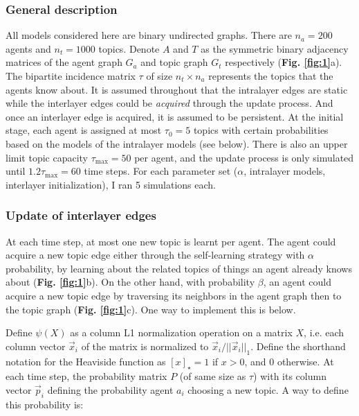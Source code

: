 \documentclass{svproc}
\begin{document}
\subsubsection*{General description}

All models considered here are binary undirected graphs. There are $n_a = 200$ agents and $n_t = 1000$ topics. Denote $A$ and $T$ as the symmetric binary adjacency matrices of the agent graph $G_a$ and topic graph $G_t$ respectively (\textbf{Fig. \ref{fig:1}}a). The bipartite incidence matrix $\tau$ of size $n_t \times n_a$ represents the topics that the agents know about. It is assumed throughout that the intralayer edges are static while the interlayer edges could be \textit{acquired} through the update process. And once an interlayer edge is acquired, it is assumed to be persistent. At the initial stage, each agent is assigned at most $\tau_0 = 5$ topics with certain probabilities based on the models of the intralayer models (see below). There is also an upper limit topic capacity $\tau_{\mathrm{max}} = 50$ per agent, and the update process is only simulated until $1.2 \tau_{\mathrm{max}} = 60$ time steps. For each parameter set ($\alpha$, intralayer models, interlayer initialization), I ran 5 simulations each.

\vspace{-1em}
\subsubsection*{Update of interlayer edges}

At each time step, at most one new topic is learnt per agent. The agent could acquire a new topic edge either through the self-learning strategy with $\alpha$ probability, by learning about the related topics of things an agent already knows about (\textbf{Fig. \ref{fig:1}}b). On the other hand, with probability $\beta$, an agent could acquire a new topic edge by traversing its neighbors in the agent graph then to the topic graph (\textbf{Fig. \ref{fig:1}}c). One way to implement this is below.

Define $\psi(X)$ as a column L1 normalization operation on a matrix $X$, i.e. each column vector $\vec{x}_i$ of the matrix is normalized to $\vec{x}_i/||\vec{x}_i||_1$. Define the shorthand notation for the Heaviside function as $[x]_{\star} = 1$ if $x > 0$, and $0$ otherwise. At each time step, the probability matrix $P$ (of same size as $\tau$) with its column vector $\vec{p}_i$ defining the probability agent $a_i$ choosing a new topic. A way to define this probability is:
\end{document}
